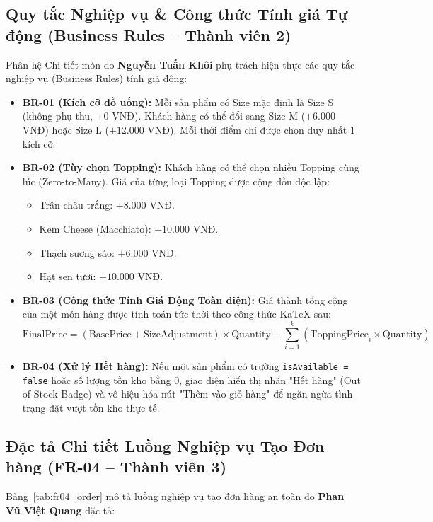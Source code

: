 \documentclass[a4paper]{article}
\begin{document}
\subsection{Quy tắc Nghiệp vụ \& Công thức Tính giá Tự động (Business Rules -- Thành viên 2)}
Phân hệ Chi tiết món do \textbf{Nguyễn Tuấn Khôi} phụ trách hiện thực các quy tắc nghiệp vụ (Business Rules) tính giá động:
\begin{itemize}
    \item \textbf{BR-01 (Kích cỡ đồ uống):} Mỗi sản phẩm có Size mặc định là Size S (không phụ thu, $+0$ VNĐ). Khách hàng có thể đổi sang Size M ($+6.000$ VNĐ) hoặc Size L ($+12.000$ VNĐ). Mỗi thời điểm chỉ được chọn duy nhất 1 kích cỡ.
    \item \textbf{BR-02 (Tùy chọn Topping):} Khách hàng có thể chọn nhiều Topping cùng lúc (Zero-to-Many). Giá của từng loại Topping được cộng dồn độc lập:
    \begin{itemize}
        \item Trân châu trắng: $+8.000$ VNĐ.
        \item Kem Cheese (Macchiato): $+10.000$ VNĐ.
        \item Thạch sương sáo: $+6.000$ VNĐ.
        \item Hạt sen tươi: $+10.000$ VNĐ.
    \end{itemize}
    \item \textbf{BR-03 (Công thức Tính Giá Động Toàn diện):} Giá thành tổng cộng của một món hàng được tính toán tức thời theo công thức KaTeX sau:
    \[
    \text{FinalPrice} = \left( \text{BasePrice} + \text{SizeAdjustment} \right) \times \text{Quantity} + \sum_{i=1}^{k} \left( \text{ToppingPrice}_i \times \text{Quantity} \right)
    \]
    \item \textbf{BR-04 (Xử lý Hết hàng):} Nếu một sản phẩm có trường \texttt{isAvailable = false} hoặc số lượng tồn kho bằng 0, giao diện hiển thị nhãn "Hết hàng" (Out of Stock Badge) và vô hiệu hóa nút "Thêm vào giỏ hàng" để ngăn ngừa tình trạng đặt vượt tồn kho thực tế.
\end{itemize}

\subsection{Đặc tả Chi tiết Luồng Nghiệp vụ Tạo Đơn hàng (FR-04 -- Thành viên 3)}
Bảng~\ref{tab:fr04_order} mô tả luồng nghiệp vụ tạo đơn hàng an toàn do \textbf{Phan Vũ Việt Quang} đặc tả:
\end{document}
